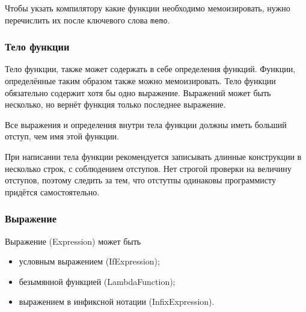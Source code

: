             Чтобы укзать компилятору какие функции необходимо мемоизировать, нужно перечислить их после ключевого слова \verb$memo$.

            

        \subsubsection{Тело функции}
            Тело функции, также может содержать в себе определения функций.
            Функции, определённые таким образом также можно мемоизировать.
            Тело функции обязательно содержит хотя бы одно выражение.
            Выражений может быть несколько, но вернёт функция только последнее выражение.

            Все выражения и определения внутри тела функции должны иметь больший отступ, чем имя этой функции.

            При написании тела функции рекомендуется записывать длинные конструкции в несколько строк, с соблюдением отступов.
            Нет строгой проверки на величину отступов, поэтому следить за тем, что отстутпы одинаковы программисту придётся самостоятельно.

            

        \subsubsection{Выражение}
            Выражение (Expression) может быть
            \begin{itemize}
                \item условным выражением (IfExpression);
                \item безымянной функцией (LambdaFunction);
                \item выражением в инфиксной нотации (InfixExpression).
            \end{itemize}

            

